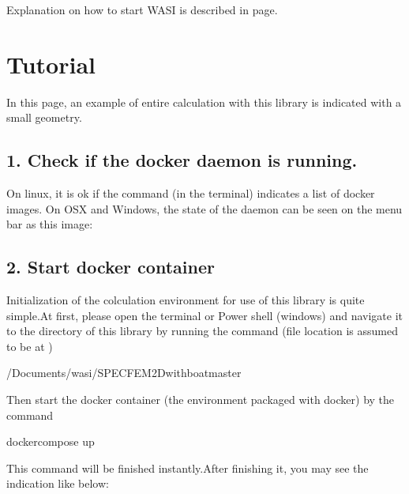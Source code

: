 \documentclass[letterpaper,10pt,english]{sphinxmanual}
\begin{document}
Explanation on how to start WASI is described in {\hyperref[\detokenize{tutorial::doc}]{}} page.


\chapter{Tutorial}
\label{\detokenize{tutorial:tutorial}}\label{\detokenize{tutorial::doc}}
In this page, an example of entire calculation with this library is indicated with a small geometry.


\section{1. Check if the docker daemon is running.}
\label{\detokenize{tutorial:check-if-the-docker-daemon-is-running}}
On linux, it is ok if the command  (in the terminal) indicates a list of docker images. On OSX and Windows, the state of the daemon can be seen on the menu bar as this image:




\section{2. Start docker container}
\label{\detokenize{tutorial:start-docker-container}}
Initialization of the colculation environment for use of this library is quite simple.At first, please open the terminal or Power shell (windows) and navigate it to the directory of this library by running the command (file location is assumed to be at )

\begin{sphinxVerbatim}[commandchars=\\\{\}]
 \PYGZti{}/Documents/wasi/SPECFEM2D\PYGZus{}with\PYGZus{}boat\PYGZhy{}master
\end{sphinxVerbatim}

Then start the docker container (the environment packaged with docker) by the command

\begin{sphinxVerbatim}[commandchars=\\\{\}]
docker\PYGZhy{}compose up
\end{sphinxVerbatim}

This command will be finished instantly.After finishing it, you may see the indication like below:
\end{document}
